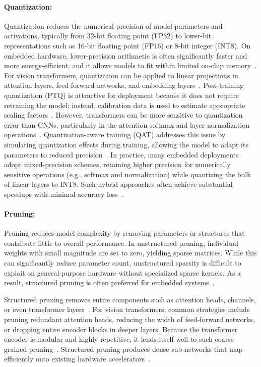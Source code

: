 \documentclass[runningheads,a4paper]{llncs}
\begin{document}
\paragraph{Quantization:}
Quantization reduces the numerical precision of model parameters and activations, typically from 32-bit floating point (FP32) to lower-bit representations such as 16-bit floating point (FP16) or 8-bit integer (INT8). On embedded hardware, lower-precision arithmetic is often significantly faster and more energy-efficient, and it allows models to fit within limited on-chip memory~\cite{Roth2024ResourceEff}. For vision transformers, quantization can be applied to linear projections in attention layers, feed-forward networks, and embedding layers~\cite{Li2023IViT}. Post-training quantization (PTQ) is attractive for deployment because it does not require retraining the model; instead, calibration data is used to estimate appropriate scaling factors~\cite{Shang2024PTQ}. However, transformers can be more sensitive to quantization error than CNNs, particularly in the attention softmax and layer normalization operations~\cite{Ranjan2024MixQViT}. Quantization-aware training (QAT) addresses this issue by simulating quantization effects during training, allowing the model to adapt its parameters to reduced precision~\cite{IBM2023QAT}. In practice, many embedded deployments adopt mixed-precision schemes, retaining higher precision for numerically sensitive operations (e.g., softmax and normalization) while quantizing the bulk of linear layers to INT8. Such hybrid approaches often achieve substantial speedups with minimal accuracy loss~\cite{Lin2022FQViT}.

\paragraph{Pruning:}
Pruning reduces model complexity by removing parameters or structures that contribute little to overall performance. In unstructured pruning, individual weights with small magnitude are set to zero, yielding sparse matrices. While this can significantly reduce parameter count, unstructured sparsity is difficult to exploit on general-purpose hardware without specialized sparse kernels. As a result, structured pruning is often preferred for embedded systems~\cite{Jiang2023SingleShot}.

Structured pruning removes entire components such as attention heads, channels, or even transformer layers~\cite{Roth2024ResourceEff}. For vision transformers, common strategies include pruning redundant attention heads, reducing the width of feed-forward networks, or dropping entire encoder blocks in deeper layers. Because the transformer encoder is modular and highly repetitive, it lends itself well to such coarse-grained pruning~\cite{Park2023PTPrune}. Structured pruning produces dense sub-networks that map efficiently onto existing hardware accelerators~\cite{Roth2024ResourceEff}.
\end{document}
